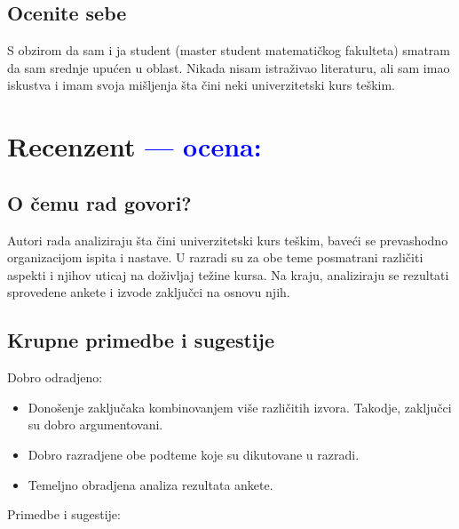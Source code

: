 \documentclass[a4paper]{report}
\newcommand{\odgovor}[1]{\textcolor{blue}{#1}}
\begin{document}
\section{Ocenite sebe}
S obzirom da sam i ja student (master student matematičkog fakulteta) smatram da sam srednje upućen u oblast. Nikada nisam istraživao literaturu, ali sam imao iskustva i imam svoja mišljenja šta čini neki univerzitetski kurs teškim.

\chapter{Recenzent \odgovor{--- ocena:} }


\section{O čemu rad govori?}

Autori rada analiziraju šta čini univerzitetski kurs teškim, baveći se prevashodno organizacijom ispita i nastave. U razradi su za obe teme posmatrani različiti aspekti i njihov uticaj na doživljaj težine kursa. Na kraju, analiziraju se rezultati sprovedene ankete i izvode zaključci na osnovu njih.

\section{Krupne primedbe i sugestije}

Dobro odradjeno:

\begin{itemize}
    \item Donošenje zaključaka kombinovanjem više različitih izvora. Takodje, zaključci su dobro argumentovani.

    \item Dobro razradjene obe podteme koje su dikutovane u razradi.

    \item Temeljno obradjena analiza rezultata ankete.

\end{itemize}


Primedbe i sugestije:
\end{document}
